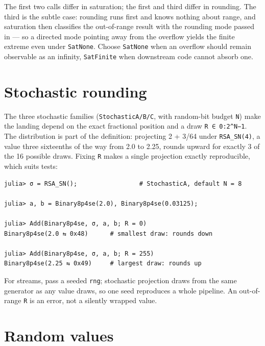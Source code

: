 The first two calls differ in saturation; the first and third differ in rounding. The third is the subtle case: rounding runs first and knows nothing about range, and saturation then classifies the out-of-range result with the rounding mode passed in — so a directed mode pointing away from the overflow yields the finite extreme even under \texttt{SatNone}. Choose \texttt{SatNone} when an overflow should remain observable as an infinity, \texttt{SatFinite} when downstream code cannot absorb one.



\section{Stochastic rounding}



\label{5064376698567748197}{}


The three stochastic families (\texttt{StochasticA/B/C}, with random-bit budget \texttt{N}) make the landing depend on the exact fractional position and a draw \texttt{R ∈ 0:2{\textasciicircum}N−1}. The distribution is part of the definition: projecting 2 + 3/64 under \texttt{RSA\_SN(4)}, a value three sixteenths of the way from 2.0 to 2.25, rounds upward for exactly 3 of the 16 possible draws. Fixing \texttt{R} makes a single projection exactly reproducible, which suits tests:




\begin{verbatim}
julia> σ = RSA_SN();                 # StochasticA, default N = 8

julia> a, b = Binary8p4se(2.0), Binary8p4se(0.03125);

julia> Add(Binary8p4se, σ, a, b; R = 0)
Binary8p4se(2.0 ⇆ 0x48)      # smallest draw: rounds down

julia> Add(Binary8p4se, σ, a, b; R = 255)
Binary8p4se(2.25 ⇆ 0x49)     # largest draw: rounds up
\end{verbatim}



For streams, pass a seeded \texttt{rng}; stochastic projection draws from the same generator as any value draws, so one seed reproduces a whole pipeline. An out-of-range \texttt{R} is an error, not a silently wrapped value.



\section{Random values}



